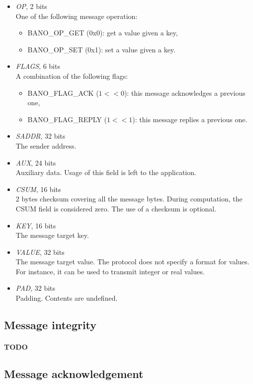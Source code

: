 \documentclass[a4paper, 11pt]{article}
\begin{document}
\begin{itemize}
\item \textit{OP}, 2 bits\\
One of the following message operation:
\begin{itemize}
\item BANO\_OP\_GET (0x0): get a value given a key,
\item BANO\_OP\_SET (0x1): set a value given a key.
\end{itemize}
\item \textit{FLAGS}, 6 bits\\
A combination of the following flags:
\begin{itemize}
\item BANO\_FLAG\_ACK ($1<<0$): this message acknowledges a previous one,
\item BANO\_FLAG\_REPLY ($1<<1$): this message replies a previous one.
\end{itemize}
\item \textit{SADDR}, 32 bits\\
The sender address.
\item \textit{AUX}, 24 bits\\
Auxiliary data. Usage of this field is left to the application.
\item \textit{CSUM}, 16 bits\\
2 bytes checksum covering all the message bytes. During computation,
the CSUM field is considered zero. The use of a checksum is optional.
\item \textit{KEY}, 16 bits\\
The message target key.
\item \textit{VALUE}, 32 bits\\
The message target value. The protocol does not specify a format for
values. For instance, it can be used to transmit integer or real values.
\item \textit{PAD}, 32 bits\\
Padding. Contents are undefined.
\end{itemize}

\subsection{Message integrity}
\paragraph{}
\textbf{TODO}

\subsection{Message acknowledgement}
\end{document}

